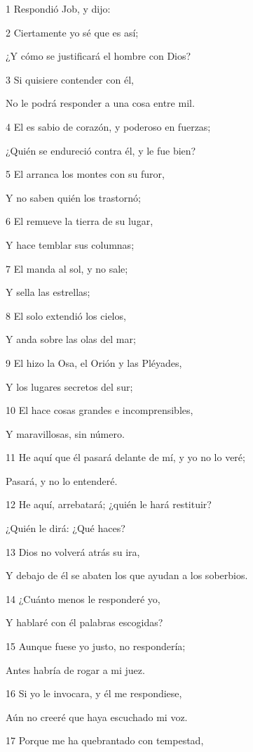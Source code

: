 \par 1 Respondió Job, y dijo:
\par 2 Ciertamente yo sé que es así;
\par ¿Y cómo se justificará el hombre con Dios?
\par 3 Si quisiere contender con él,
\par No le podrá responder a una cosa entre mil.
\par 4 El es sabio de corazón, y poderoso en fuerzas;
\par ¿Quién se endureció contra él, y le fue bien?
\par 5 El arranca los montes con su furor,
\par Y no saben quién los trastornó;
\par 6 El remueve la tierra de su lugar,
\par Y hace temblar sus columnas;
\par 7 El manda al sol, y no sale;
\par Y sella las estrellas;
\par 8 El solo extendió los cielos,
\par Y anda sobre las olas del mar;
\par 9 El hizo la Osa, el Orión y las Pléyades, 
\par Y los lugares secretos del sur; 
\par 10 El hace cosas grandes e incomprensibles,
\par Y maravillosas, sin número.
\par 11 He aquí que él pasará delante de mí, y yo no lo veré;
\par Pasará, y no lo entenderé.
\par 12 He aquí, arrebatará; ¿quién le hará restituir?
\par ¿Quién le dirá: ¿Qué haces?
\par 13 Dios no volverá atrás su ira,
\par Y debajo de él se abaten los que ayudan a los soberbios.
\par 14 ¿Cuánto menos le responderé yo,
\par Y hablaré con él palabras escogidas?
\par 15 Aunque fuese yo justo, no respondería;
\par Antes habría de rogar a mi juez.
\par 16 Si yo le invocara, y él me respondiese,
\par Aún no creeré que haya escuchado mi voz.
\par 17 Porque me ha quebrantado con tempestad,
